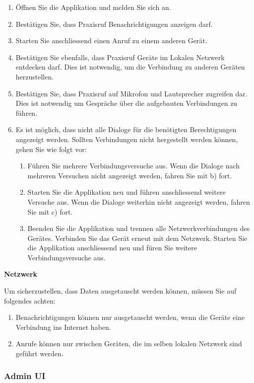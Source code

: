 \begin{enumerate}
    \item Öffnen Sie die Applikation und melden Sie sich an.
    \item Bestätigen Sie, dass Praxisruf Benachrichtigungen anzeigen darf.
    \item Starten Sie anschliessend einen Anruf zu einem anderen Gerät.
    \item Bestätigen Sie ebenfalls, dass Praxisruf Geräte im Lokalen Netzwerk entdecken darf.
    Dies ist notwendig, um die Verbindung zu anderen Geräten herzustellen.
    \item Bestätigen Sie, dass Praxisruf auf Mikrofon und Lautsprecher zugreifen dar.
    Dies ist notwendig um Gespräche über die aufgebauten Verbindungen zu führen.
    \item Es ist möglich, dass nicht alle Dialoge für die benötigten Berechtigungen angezeigt werden.
    Sollten Verbindungen nicht hergestellt werden können, gehen Sie wie folgt vor:
    \begin{enumerate}
              \item Führen Sie mehrere Verbindungsversuche aus. Wenn die Dialoge nach mehreren Versuchen nicht angezeigt werden, fahren Sie mit b) fort.
              \item Starten Sie die Applikation neu und führen anschliessend weitere Versuche aus. Wenn die Dialoge weiterhin nicht angezeigt werden, fahren Sie mit c) fort.
              \item Beenden Sie die Applikation und trennen alle Netzwerkverbindungen des Gerätes. Verbinden Sie das Gerät erneut mit dem Netzwerk. Starten Sie die Applikation anschliessend neu und füren Sie weitere Verbindungsversuche aus.
    \end{enumerate}
\end{enumerate}

\textbf{Netzwerk}

Um sicherzustellen, dass Daten ausgetauscht werden können, müssen Sie auf folgendes achten:

\begin{enumerate}
    \item Benachrichtigungen können nur ausgetauscht werden, wenn die Geräte eine Verbindung ins Internet haben.
    \item Anrufe können nur zwischen Geräten, die im selben lokalen Netzwerk sind geführt werden.
\end{enumerate}

\subsubsection*{Admin UI}

